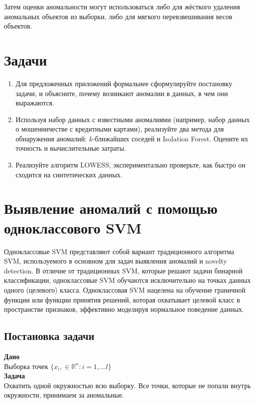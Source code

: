 Затем оценки аномальности могут использоваться либо для жёсткого удаления аномальных объектов из выборки, либо для мягкого перевзвешивания весов объектов.

\section{Задачи}
\begin{enumerate}
    \item Для предложенных приложений формальнее сформулируйте постановку задачи, и объясните, почему возникают аномалии в данных, в чем они выражаются.
    \item Используя набор данных с известными аномалиями (например, набор данных о мошенничестве с кредитными картами), реализуйте два метода для обнаружения аномалий: $k$-ближайших соседей и Isolation Forest. Оцените их точность и вычислительные затраты.
    \item Реализуйте алгоритм LOWESS, экспериментально проверьте, как быстро он сходится на синтетических данных. 
\end{enumerate}

\section*{Выявление аномалий с помощью одноклассового SVM}

Одноклассовые SVM представляют собой вариант традиционного алгоритма SVM, используемого в основном для задач выявления аномалий и novelty detection. В отличие от традиционных SVM, которые решают задачи бинарной классификации, одноклассовые SVM обучаются исключительно на точках данных одного (целевого) класса. Одноклассовая SVM нацелена на обучение граничной функции или функции принятия решений, которая охватывает целевой класс в пространстве признаков, эффективно моделируя нормальное поведение данных.
\\

\subsection{Постановка задачи}

\textbf{Дано} \\

Выборка точек $\{x_i, \in \mathbb{R}^n : i = 1, ... l\}$\\

\textbf{Задача} \\

Охватить одной окружностью всю выборку. Все точки, которые не попали внутрь окружности, принимаем за аномальные.\\

